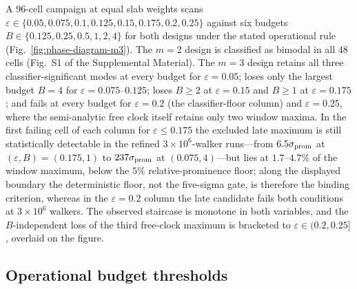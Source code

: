 \documentclass[aps,physrev,reprint,amsmath,amssymb,longbibliography,floatfix]{revtex4-2}
\begin{document}
A \(96\)-cell campaign at equal slab weights scans
\(\varepsilon\in\{0.05,0.075,0.1,0.125,0.15,0.175,0.2,0.25\}\) against six
budgets \(B\in\{0.125,0.25,0.5,1,2,4\}\) for both designs under the stated
operational rule (Fig.~\ref{fig:phase-diagram-m3}).  The \(m=2\) design is
classified as bimodal in all \(48\) cells (Fig.~S1 of the Supplemental
Material).  The \(m=3\) design retains all
three classifier-significant modes at
every budget for \(\varepsilon=0.05\); loses only the largest budget
\(B=4\) for \(\varepsilon=0.075\)--\(0.125\); loses \(B\ge2\) at
\(\varepsilon=0.15\) and \(B\ge1\) at \(\varepsilon=0.175\); and fails at
every budget for \(\varepsilon=0.2\) (the classifier-floor column) and
\(\varepsilon=0.25\), where the semi-analytic free clock itself retains only
two window maxima.  In the first failing cell of each column for
\(\varepsilon\le0.175\) the excluded late maximum is still statistically
detectable in the refined \(3\times10^{6}\)-walker runs---from \(6.5\sigma_{\rm prom}\)
at \((\varepsilon,B)=(0.175,1)\) to \(237\sigma_{\rm prom}\) at \((0.075,4)\)---but
lies at \(1.7\)--\(4.7\%\) of the window maximum, below the \(5\%\)
relative-prominence floor; along the displayed boundary the deterministic
floor, not the five-sigma gate, is therefore the binding criterion, whereas
in the \(\varepsilon=0.2\) column the late candidate fails both conditions
at \(3\times10^{6}\) walkers.  The observed staircase is monotone in both
variables,
and the \(B\)-independent loss of the third free-clock maximum is bracketed
to \(\varepsilon\in(0.2,0.25]\), overlaid on the figure.

\subsection{Operational budget thresholds}
\label{sec:numerics-thresholds}
\end{document}
